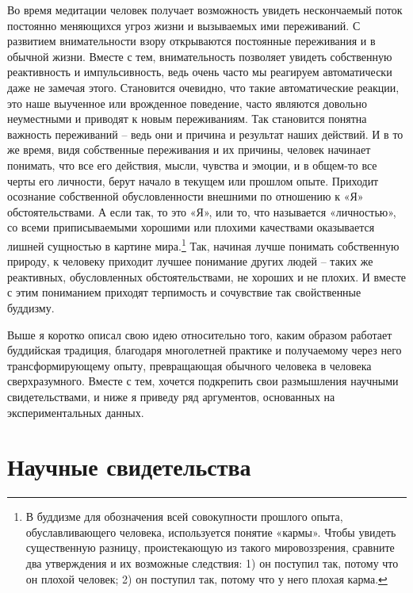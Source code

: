 \documentclass[12pt,a4paper]{report}
\begin{document}
\noindent Во время медитации человек получает возможность увидеть нескончаемый поток постоянно меняющихся угроз жизни и вызываемых ими переживаний. С развитием внимательности взору открываются постоянные переживания и в обычной жизни. Вместе с тем, внимательность позволяет увидеть собственную реактивность и импульсивность, ведь очень часто мы реагируем автоматически даже не замечая этого. Становится очевидно, что такие автоматические реакции, это наше выученное или врожденное поведение, часто являются довольно неуместными и приводят к новым переживаниям. Так становится понятна важность переживаний -- ведь они и причина и результат наших действий. И в то же время, видя собственные переживания и их причины, человек начинает понимать, что все его действия, мысли, чувства и эмоции, и в общем-то все черты его личности, берут начало в текущем или прошлом опыте. Приходит осознание собственной обусловленности внешними по отношению к «Я» обстоятельствами. А если так, то это «Я», или то, что называется «личностью», со всеми приписываемыми хорошими или плохими качествами оказывается лишней сущностью в картине мира.\footnote{В буддизме для обозначения всей совокупности прошлого опыта, обуславливающего человека, используется понятие «кармы». Чтобы увидеть существенную разницу, проистекающую из такого мировоззрения, сравните два утверждения и их возможные следствия: 1) он поступил так, потому что он плохой человек; 2) он поступил так, потому что у него плохая карма.} Так, начиная лучше понимать собственную природу, к человеку приходит лучшее понимание других людей -- таких же реактивных, обусловленных обстоятельствами, не хороших и не плохих. И вместе с этим пониманием приходят терпимость и сочувствие так свойственные буддизму.

\noindent Выше я коротко описал свою идею относительно того, каким образом работает буддийская традиция, благодаря многолетней практике и получаемому через него трансформирующему опыту, превращающая обычного человека в человека сверхразумного. Вместе с тем, хочется подкрепить свои размышления научными свидетельствами, и ниже я приведу ряд аргументов, основанных на экспериментальных данных.

\section*{Научные свидетельства}
\end{document}
